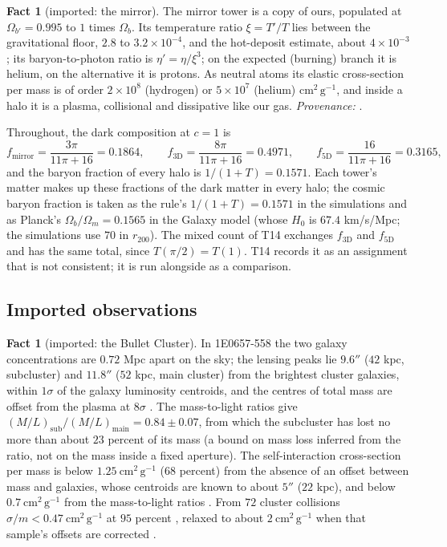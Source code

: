 \documentclass[11pt]{article}
\theoremstyle{definition}
\newtheorem{fact}[theorem]{Fact}
\newcommand{\cmg}{\mathrm{cm^{2}\,g^{-1}}}
\begin{document}
\begin{fact}[imported: the mirror]\label{fact:mirror}
The mirror tower is a copy of ours, populated at $\Omega_{b'} = 0.995$ to $1$ times $\Omega_{b}$. Its temperature ratio $\xi = T'/T$ lies between the gravitational floor, $2.8$ to $3.2 \times 10^{-4}$, and the hot-deposit estimate, about $4 \times 10^{-3}$; its baryon-to-photon ratio is $\eta' = \eta/\xi^{3}$; on the expected (burning) branch it is helium, on the alternative it is protons. As neutral atoms its elastic cross-section per mass is of order $2 \times 10^{8}$ (hydrogen) or $5 \times 10^{7}$ (helium) $\cmg$, and inside a halo it is a plasma, collisional and dissipative like our gas. \emph{Provenance:} \cite[Thm.~4.3, Props.~4.6 and 4.7, Prop.~6.2]{ButlerT14}.
\end{fact}

Throughout, the dark composition at $c = 1$ is
\begin{equation}\label{eq:shares}
f_{\mathrm{mirror}} = \frac{3\pi}{11\pi + 16} = 0.1864,\qquad
f_{3\mathrm{D}} = \frac{8\pi}{11\pi + 16} = 0.4971,\qquad
f_{5\mathrm{D}} = \frac{16}{11\pi + 16} = 0.3165,
\end{equation}
and the baryon fraction of every halo is $1/(1 + T) = 0.1571$. Each tower's matter makes up these fractions of the dark matter in every halo; the cosmic baryon fraction is taken as the rule's $1/(1 + T) = 0.1571$ in the simulations and as Planck's $\Omega_{b}/\Omega_{m} = 0.1565$ in the Galaxy model (whose $H_{0}$ is $67.4$ km/s/Mpc; the simulations use $70$ in $r_{200}$). The mixed count of T14 \cite[Rem.~7.10]{ButlerT14} exchanges $f_{3\mathrm{D}}$ and $f_{5\mathrm{D}}$ and has the same total, since $T(\pi/2) = T(1)$. T14 records it as an assignment that is not consistent; it is run alongside as a comparison.

\subsection{Imported observations}

\begin{fact}[imported: the Bullet Cluster]\label{fact:bullet}
In 1E0657-558 the two galaxy concentrations are $0.72$ Mpc apart on the sky; the lensing peaks lie $9.6''$ ($42$ kpc, subcluster) and $11.8''$ ($52$ kpc, main cluster) from the brightest cluster galaxies, within $1\sigma$ of the galaxy luminosity centroids, and the centres of total mass are offset from the plasma at $8\sigma$ \cite{Clowe2006}. The mass-to-light ratios give $(M/L)_{\mathrm{sub}}/(M/L)_{\mathrm{main}} = 0.84 \pm 0.07$, from which the subcluster has lost no more than about $23$ percent of its mass (a bound on mass loss inferred from the ratio, not on the mass inside a fixed aperture). The self-interaction cross-section per mass is below $1.25\ \cmg$ ($68$ percent) from the absence of an offset between mass and galaxies, whose centroids are known to about $5''$ ($22$ kpc), and below $0.7\ \cmg$ from the mass-to-light ratios \cite{Randall2008}. From $72$ cluster collisions $\sigma/m < 0.47\ \cmg$ at $95$ percent \cite{Harvey2015}, relaxed to about $2\ \cmg$ when that sample's offsets are corrected \cite{Wittman2018}.
\end{fact}
\end{document}
